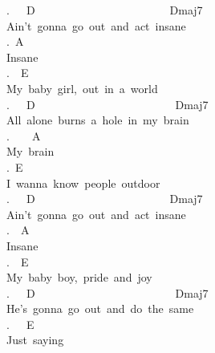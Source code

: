 {.\ \ \ D\ \ \ \ \ \ \ \ \ \ \ \ \ \ \ \ \ \ \ \ \ \ \ \ Dmaj7\\
Ain't\ gonna\ go\ out\ and\ act\ insane\\
.\ A\\
Insane\\
.\ \ E\\
My\ baby\ girl,\ out\ in\ a\ world\\
.\ \ \ D\ \ \ \ \ \ \ \ \ \ \ \ \ \ \ \ \ \ \ \ \ \ \ \ \ Dmaj7\\
All\ alone\ burns\ a\ hole\ in\ my\ brain\\
.\ \ \ \ A\\
My\ brain\\
.\ E\\
I\ wanna\ know\ people\ outdoor\\
.\ \ \ D\ \ \ \ \ \ \ \ \ \ \ \ \ \ \ \ \ \ \ \ \ \ \ \ Dmaj7\\
Ain't\ gonna\ go\ out\ and\ act\ insane\\
.\ \ A\\
Insane\\
.\ \ E\\
My\ baby\ boy,\ pride\ and\ joy\\
.\ \ \ D\ \ \ \ \ \ \ \ \ \ \ \ \ \ \ \ \ \ \ \ \ \ \ \ \ Dmaj7\\
He's\ gonna\ go\ out\ and\ do\ the\ same\\
.\ \ \ E\\
Just\ saying}
